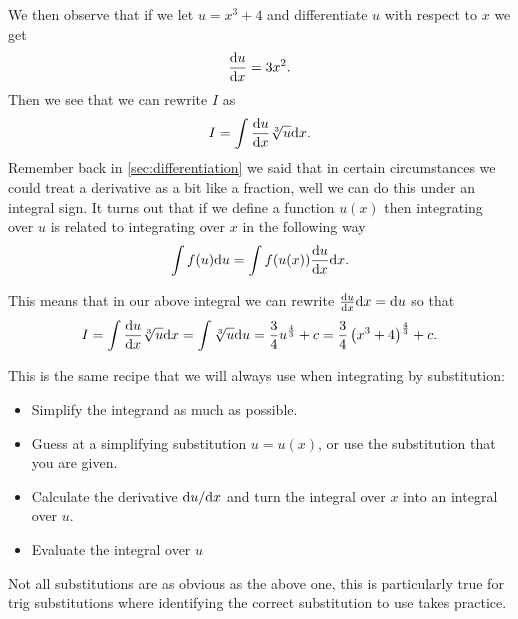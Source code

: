 We then observe that if we let $u=x^{3}+4$ and differentiate $u$ with respect to $x$ we get
\begin{equation*}
\frac{\mathrm{d} u}{\mathrm{d} x}=3x^{2}.
\end{equation*}
Then we see that we can rewrite $I$ as
\begin{equation*}
I=\int \frac{\mathrm{d} u}{\mathrm{d} x}\sqrt[3]{u}\mathrm{d} x.
\end{equation*}
Remember back in \cref{sec:differentiation} we said that in certain circumstances we could treat a derivative as a bit like a fraction, well we can do this under an integral sign. It turns out that if we define a function $u(x)$ then integrating over $u$ is related to integrating over $x$ in the following way
\begin{equation}
\int f(u)\mathrm{d} u=\int f(u(x))\frac{\mathrm{d} u}{\mathrm{d} x}\mathrm{d} x.
\label{eq: measure change of variable}
\end{equation}

This means that in our above integral we can rewrite $\frac{\mathrm{d} u}{\mathrm{d} x}\mathrm{d} x=\mathrm{d} u$ so that
\begin{equation*}
I=\int \frac{\mathrm{d} u}{\mathrm{d} x}\sqrt[3]{u}\mathrm{d} x=\int \sqrt[3]{u}\mathrm{d} u=\frac{3}{4}u^{\frac{4}{3}}+c=\frac{3}{4}\left(x^{3}+4\right)^{\frac{4}{3}}+c.
\end{equation*}

This is the same recipe that we will always use when integrating by substitution:

\begin{itemize}
\item Simplify the integrand as much as possible.
\item Guess at a simplifying substitution $u=u(x)$, or use the substitution that you are given.
\item Calculate the derivative $\mathrm{d} u/\mathrm{d} x$ and turn the integral over $x$ into an integral over $u$.
\item Evaluate the integral over $u$
\end{itemize}

Not all substitutions are as obvious as the above one, this is particularly true for trig substitutions where identifying the correct substitution to use takes practice.

